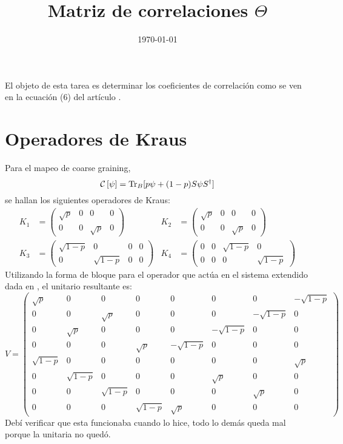 \documentclass[onecolumn,11pt]{article}
\title{Matriz de correlaciones $\Theta$}
\date{\today}
\newcommand{\mcC}{\mathcal{C}}
\newcommand{\CG}[1]{\mcC\left[#1\right]}
\begin{document}
\maketitle
\thispagestyle{empty}
El objeto de esta tarea es determinar los coeficientes de correlación como se ven en la ecuación (6) del artículo \cite{CGEmergingDynamics}.

\section{Operadores de Kraus}

Para el mapeo de coarse graining,
\begin{equation}
\CG{\psi}=\Tr_{B}[p\psi+(1-p)S\psi S^{\dag}]
\end{equation}
se hallan los siguientes operadores de Kraus:
\begin{align}
    K_{1}&=\begin{pmatrix} \sqrt{p}&0&0&0\\0&0&\sqrt{p}&0\end{pmatrix} & K_{2}&=\begin{pmatrix} \sqrt{p}&0&0&0\\0&0&\sqrt{p}&0\end{pmatrix} \\ K_{3}&=\begin{pmatrix} \sqrt{1-p}&0&0&0\\0&\sqrt{1-p}&0&0\end{pmatrix} & K_{4}&=\begin{pmatrix} 0&0&\sqrt{1-p}&0\\0&0&0&\sqrt{1-p}\end{pmatrix}
\end{align}
Utilizando la forma de bloque para el operador que actúa en el sistema extendido dada en \cite{Chuang}, el unitario resultante es:
\begin{equation}
V=\begin{pmatrix}
\sqrt{p}&0&0&0&0&0&0&-\sqrt{1 - p}\\
0&0&\sqrt{p}&0&0&0&-\sqrt{1 - p}&0\\
0&\sqrt{p}&0&0&0&-\sqrt{1 - p}&0&0\\
0&0&0&\sqrt{p}&-\sqrt{1 - p}&0&0&0\\
\sqrt{1 - p}&0&0&0&0&0&0&\sqrt{p}\\
0&\sqrt{1 - p}&0&0&0&\sqrt{p}&0&0\\
0&0&\sqrt{1 - p}&0&0&0&\sqrt{p}&0\\
0&0&0&\sqrt{1 - p}&\sqrt{p}&0&0&0 
\end{pmatrix}
\end{equation}
Debí verificar que esta funcionaba cuando lo hice, todo lo demás queda mal porque la unitaria no quedó.


\end{document}
